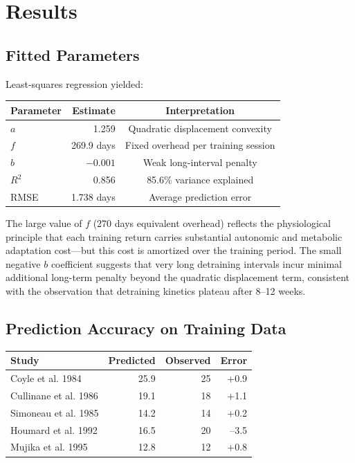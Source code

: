 \documentclass[12pt,a4paper]{article}
\begin{document}
\section{Results}

\subsection{Fitted Parameters}

Least-squares regression yielded:

\begin{center}
\begin{tabular}{l r c}
\toprule
\textbf{Parameter} & \textbf{Estimate} & \textbf{Interpretation} \\
\midrule
$a$ & 1.259 & Quadratic displacement convexity \\
$f$ & 269.9 days & Fixed overhead per training session \\
$b$ & $-0.001$ & Weak long-interval penalty \\
$R^2$ & 0.856 & 85.6\% variance explained \\
RMSE & 1.738 days & Average prediction error \\
\bottomrule
\end{tabular}
\end{center}

The large value of $f$ (270 days equivalent overhead) reflects the physiological principle that each training return carries substantial autonomic and metabolic adaptation cost—but this cost is amortized over the training period. The small negative $b$ coefficient suggests that very long detraining intervals incur minimal additional long-term penalty beyond the quadratic displacement term, consistent with the observation that detraining kinetics plateau after 8--12 weeks.

\subsection{Prediction Accuracy on Training Data}

\begin{center}
\begin{tabular}{l r r r}
\toprule
\textbf{Study} & Predicted & Observed & Error \\
\midrule
Coyle et al. 1984 & 25.9 & 25 & +0.9 \\
Cullinane et al. 1986 & 19.1 & 18 & +1.1 \\
Simoneau et al. 1985 & 14.2 & 14 & +0.2 \\
Houmard et al. 1992 & 16.5 & 20 & --3.5 \\
Mujika et al. 1995 & 12.8 & 12 & +0.8 \\
\bottomrule
\end{tabular}
\end{center}
\end{document}
